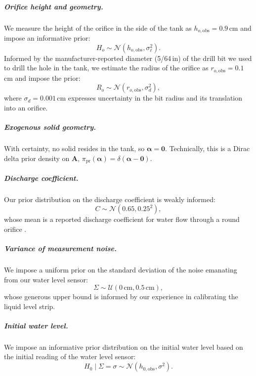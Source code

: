 \documentclass[openacc]{rsproca_new}%
\begin{document}
\vspace{-\baselineskip}
\subparagraph{Orifice height and geometry.} 
We measure the height of the orifice in the side of the tank as $h_{o, \text{obs}}=0.9$\,cm and impose an informative prior:
\begin{equation}
H_o \sim \mathcal{N}(h_{o, \text{obs}}, \sigma_\ell^2).
\end{equation}
Informed by the manufacturer-reported diameter (5/64\,in) of the drill bit we used to drill the hole in the tank, we estimate the radius of the orifice as $r_{o, \text{obs}}=0.1$\,cm and impose the prior:
\begin{equation}
R_o \sim \mathcal{N}(r_{o, \text{obs}}, \sigma_d^2), \label{eq:R_o_prior}
\end{equation}
where $\sigma_d= 0.001$\,cm expresses uncertainty in the bit radius and its translation into an orifice.

\vspace{-\baselineskip}
\subparagraph{Exogenous solid geometry.}
With certainty, no solid resides in the tank, so $\boldsymbol \alpha=\mathbf{0}$. Technically, this is a Dirac delta prior density on $\mathbf{A}$, $\pi_{\text{pr}}(\boldsymbol \alpha)=\delta(\boldsymbol \alpha - \mathbf{0})$. 




\vspace{-\baselineskip}
\subparagraph{Discharge coefficient.} 
Our prior distribution on the discharge coefficient is weakly informed:
\begin{equation}
	C \sim \mathcal{N}(0.65, 0.25^2),
\end{equation} whose mean is a reported discharge coefficient for water flow through a round orifice \cite{hicks2014determining}. 

\vspace{-\baselineskip}
\subparagraph{Variance of measurement noise.} 
We impose a uniform prior on the standard deviation of the noise emanating from our water level sensor:
\begin{equation}
\Sigma \sim \mathcal{U}(0\,\text{cm}, 0.5\,\text{cm}),
\end{equation} whose generous upper bound is informed by our experience in calibrating the liquid level strip. 

\vspace{-\baselineskip}
\subparagraph{Initial water level.} We impose an informative prior distribution on the initial water level based on the initial reading of the water level sensor:
\begin{equation}
	H_0 \mid \Sigma=\sigma \sim \mathcal{N}(h_{0, \text{obs}}, \sigma^2).
\end{equation} 
\end{document}
